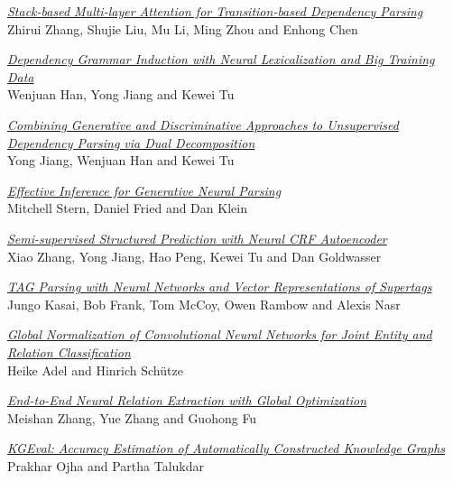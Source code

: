 \hyperlink{page.1676}{\em Stack-based Multi-layer Attention for Transition-based Dependency Parsing}\samepage \\
\hspace*{7mm} Zhirui Zhang, Shujie Liu, Mu Li, Ming Zhou and Enhong Chen\dotfill {}

\hyperlink{page.1682}{\em Dependency Grammar Induction with Neural Lexicalization and Big Training Data}\samepage \\
\hspace*{7mm} Wenjuan Han, Yong Jiang and Kewei Tu\dotfill {}

\hyperlink{page.1688}{\em Combining Generative and Discriminative Approaches to Unsupervised Dependency Parsing via Dual Decomposition}\samepage \\
\hspace*{7mm} Yong Jiang, Wenjuan Han and Kewei Tu\dotfill {}

\hyperlink{page.1694}{\em Effective Inference for Generative Neural Parsing}\samepage \\
\hspace*{7mm} Mitchell Stern, Daniel Fried and Dan Klein\dotfill {}

\hyperlink{page.1700}{\em Semi-supervised Structured Prediction with Neural CRF Autoencoder}\samepage \\
\hspace*{7mm} Xiao Zhang, Yong Jiang, Hao Peng, Kewei Tu and Dan Goldwasser\dotfill {}

\hyperlink{page.1711}{\em TAG Parsing with Neural Networks and Vector Representations of Supertags}\samepage \\
\hspace*{7mm} Jungo Kasai, Bob Frank, Tom McCoy, Owen Rambow and Alexis Nasr\dotfill {}

\hyperlink{page.1722}{\em Global Normalization of Convolutional Neural Networks for Joint Entity and Relation Classification}\samepage \\
\hspace*{7mm} Heike Adel and Hinrich Sch\"{u}tze\dotfill {}

\hyperlink{page.1729}{\em End-to-End Neural Relation Extraction with Global Optimization}\samepage \\
\hspace*{7mm} Meishan Zhang, Yue Zhang and Guohong Fu\dotfill {}

\hyperlink{page.1740}{\em KGEval: Accuracy Estimation of Automatically Constructed Knowledge Graphs}\samepage \\
\hspace*{7mm} Prakhar Ojha and Partha Talukdar\dotfill {}

